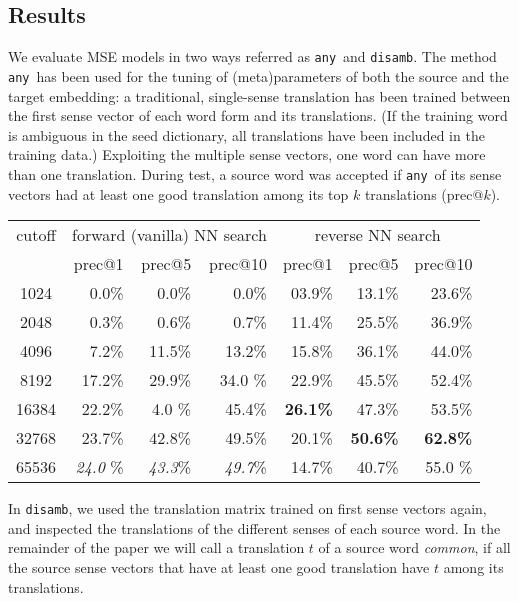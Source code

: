 \documentclass[11pt]{article}
\begin{document}
\subsection{Results}

\newcommand{\any}{\texttt{any}}
\newcommand{\disamb}{\texttt{disamb}}

We evaluate MSE models in two ways referred as \any~and \disamb.
The method \any~has been used for the tuning of (meta)parameters of
both the source and the target embedding: a traditional, single-sense
translation has been trained between the first sense vector of each word form and
its translations. (If the training word is ambiguous in the seed dictionary,
all translations have been included in the training data.)  Exploiting the
multiple sense vectors, one word can have more than one translation.  During
test, a source word was accepted if \any~of its sense vectors had at least one
good translation among its top $k$ translations (prec@$k$).

\begin{table*} \centering
  \begin{tabular}{c|rrr|rrr}
    \toprule
    cutoff &
    \multicolumn{3}{c|}{forward (vanilla) NN search} &
    \multicolumn{3}{c}{reverse NN search} \\
    & prec@1 & prec@5 & prec@10 & prec@1 & prec@5 & prec@10 \\
    \midrule
    1024 & 0.0\% & 0.0\% & 0.0\% & 03.9\% & 13.1\% & 23.6\% \\
    2048 & 0.3\% & 0.6\% & 0.7\% & 11.4\% & 25.5\% & 36.9\% \\
    4096 & 7.2\% & 11.5\% & 13.2\% & 15.8\% & 36.1\% & 44.0\% \\
    8192 & 17.2\% & 29.9\% & 34.0 \%& 22.9\% & 45.5\% & 52.4\% \\
    16384 & 22.2\% & 4.0 \% & 45.4\% & \textbf{26.1\%} & 47.3\% & 53.5\% \\
    32768 & 23.7\% & 42.8\% & 49.5\% & 20.1\% & \textbf{50.6\%} & \textbf{62.8\%} \\
    65536 & \emph{24.0} \%& \emph{43.3}\% & \emph{49.7}\% & 14.7\% & 40.7\% & 55.0 \%\\
    \bottomrule
  \end{tabular}
  \caption{Precision of \any~reverse NN when translating from an AdaGram model
  trained on HNC (600 dimensions, $\alpha=.05$)}
  \label{tab:prec}
\end{table*}

In \disamb, we used the translation matrix trained on first sense vectors again,
and inspected the translations of the different senses of each source word.
In the remainder of the paper we will call a translation $t$ of a source word
\emph{common}, if all the source sense vectors that have at least one good
translation have $t$ among its translations. \todo{}
\end{document}
